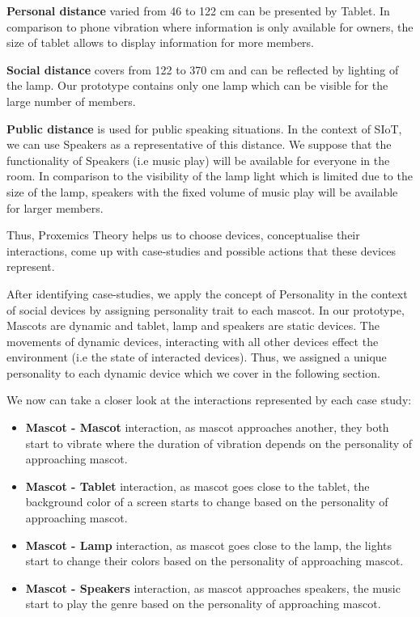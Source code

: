 \textbf{Personal distance} varied from 46 to 122 cm can be presented by Tablet.
In comparison to phone vibration where information is only available for owners,
the size of tablet allows to display information for more members.

\textbf{Social distance} covers from 122 to 370 cm and can be reflected by lighting of the lamp.
Our prototype contains only one lamp which can be visible for the large number of members.

\textbf{Public distance} is used for public speaking situations.
In the context of SIoT, we can use Speakers as a representative of this distance.
We suppose that the functionality of Speakers (i.e music play) will be available for everyone in the room.
In comparison to the visibility of the lamp light which is limited due to the size of the lamp,
speakers with the fixed volume of music play will be available for larger members.

Thus, Proxemics Theory helps us to choose devices, conceptualise their interactions,
come up with case-studies and possible actions that these devices represent.

After identifying case-studies, we apply the concept of Personality in the context of
social devices by assigning personality trait to each mascot.
In our prototype, Mascots are dynamic and tablet, lamp and speakers are static devices.
The movements of dynamic devices, interacting with all other
devices effect the environment (i.e the state of interacted devices).
Thus, we assigned a unique personality to each dynamic device which we cover in the following section.

We now can take a closer look at the interactions represented by each case study:
\begin{itemize}
  \item \textbf{Mascot - Mascot} interaction, as mascot approaches another,
        they both start to vibrate where the duration of vibration depends on the personality of approaching mascot.
  \item \textbf{Mascot - Tablet} interaction, as mascot goes close to the tablet, the background
        color of a screen starts to change based on the personality of approaching mascot.
   \item \textbf{Mascot - Lamp} interaction, as mascot goes close to the lamp,
        the lights start to change their colors based on the personality of approaching mascot.
   \item \textbf{Mascot - Speakers} interaction, as mascot approaches speakers,
        the music start to play the genre based on the personality of approaching mascot.
\end{itemize}

